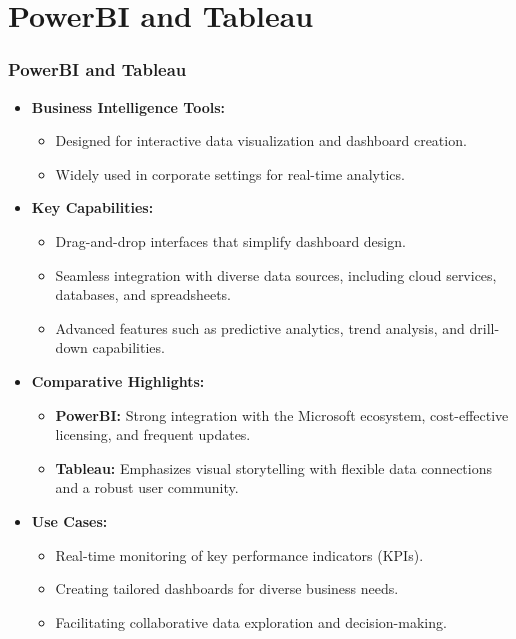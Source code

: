 \documentclass[10pt]{beamer}
\begin{document}
\section{PowerBI and Tableau}

\begin{frame}
    \frametitle{PowerBI and Tableau}
    \begin{itemize}
        \item \textbf{Business Intelligence Tools:}
            \begin{itemize}
                \item Designed for interactive data visualization and dashboard creation.
                \item Widely used in corporate settings for real-time analytics.
            \end{itemize}
        \item \textbf{Key Capabilities:}
            \begin{itemize}
                \item Drag-and-drop interfaces that simplify dashboard design.
                \item Seamless integration with diverse data sources, including cloud services, databases, and spreadsheets.
                \item Advanced features such as predictive analytics, trend analysis, and drill-down capabilities.
            \end{itemize}
        \item \textbf{Comparative Highlights:}
            \begin{itemize}
                \item \textbf{PowerBI:} Strong integration with the Microsoft ecosystem, cost-effective licensing, and frequent updates.
                \item \textbf{Tableau:} Emphasizes visual storytelling with flexible data connections and a robust user community.
            \end{itemize}
        \item \textbf{Use Cases:}
            \begin{itemize}
                \item Real-time monitoring of key performance indicators (KPIs).
                \item Creating tailored dashboards for diverse business needs.
                \item Facilitating collaborative data exploration and decision-making.
            \end{itemize}
    \end{itemize}
\end{frame}

\end{document}
